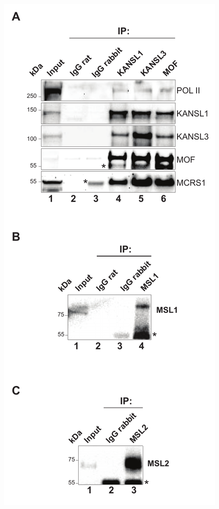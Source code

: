 \begin{footnotesize}
\begin{sffamily}
\begin{singlespacing}
\newpage
%
\begin{minipage}[c]{0.4\textwidth}
\includegraphics{Figures/Appendix/Figure1_supplemental_figure2_scissored.pdf}

\end{minipage}
\end{singlespacing}
\end{sffamily}
\end{footnotesize}
